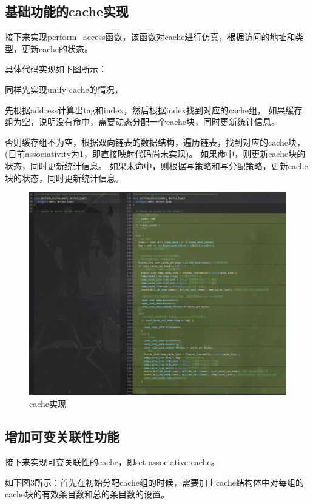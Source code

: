\documentclass[12pt,hyperref,a4paper,UTF8]{ctexart}
\begin{document}
\subsection{基础功能的cache实现}

接下来实现perform\_access函数，该函数对cache进行仿真，根据访问的地址和类型，更新cache的状态。

具体代码实现如下图所示：

同样先实现unify cache的情况，

先根据address计算出tag和index，然后根据index找到对应的cache组，
如果缓存组为空，说明没有命中，需要动态分配一个cache块，同时更新统计信息。

否则缓存组不为空，根据双向链表的数据结构，遍历链表，找到对应的cache块，(目前associativity为1，即直接映射代码尚未实现)。
如果命中，则更新cache块的状态，同时更新统计信息。
如果未命中，则根据写策略和写分配策略，更新cache块的状态，同时更新统计信息。


\begin{figure}[H]
    \centering
    \includegraphics[width=1\textwidth]{./figures/fig/image2.png}
    \caption{cache实现}
\end{figure}


\subsection{增加可变关联性功能}

接下来实现可变关联性的cache，即set-associative cache。



如下图3所示：首先在初始分配cache组的时候，需要加上cache结构体中对每组的cache块的有效条目数和总的条目数的设置。
\end{document}
